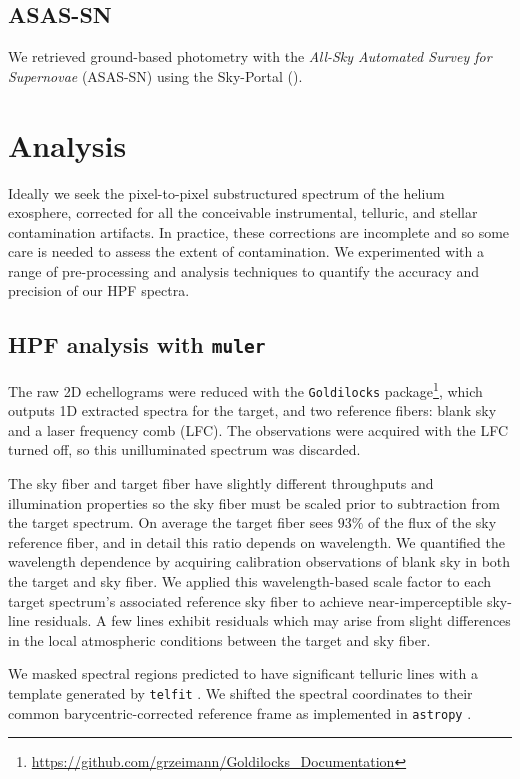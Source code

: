 \documentclass[twocolumn]{aastex631}
\begin{document}
\subsection{ASAS-SN}
We retrieved ground-based photometry with the \emph{All-Sky Automated Survey for Supernovae} (ASAS-SN) using the Sky-Portal ().



\section{Analysis}


Ideally we seek the pixel-to-pixel substructured spectrum of the helium exosphere, corrected for all the conceivable instrumental, telluric, and stellar contamination artifacts.  In practice, these corrections are incomplete and so some care is needed to assess the extent of contamination.  We experimented with a range of pre-processing and analysis techniques to quantify the accuracy and precision of our HPF spectra.

\subsection{HPF analysis with \texttt{muler} }

The raw 2D echellograms were reduced with the \texttt{Goldilocks} package\footnote{\url{https://github.com/grzeimann/Goldilocks_Documentation}}, which outputs 1D extracted spectra for the target, and two reference fibers: blank sky and a laser frequency comb (LFC).  The observations were acquired with the LFC turned off, so this unilluminated spectrum was discarded.

The sky fiber and target fiber have slightly different throughputs and illumination properties so the sky fiber must be scaled prior to subtraction from the target spectrum.  On average the target fiber sees $93\%$ of the flux of the sky reference fiber, and in detail this ratio depends on wavelength.  We quantified the wavelength dependence by acquiring calibration observations of blank sky in both the target and sky fiber.  We applied this wavelength-based scale factor to each target spectrum's associated reference sky fiber to achieve near-imperceptible sky-line residuals.  A few lines exhibit residuals which may arise from slight differences in the local atmospheric conditions between the target and sky fiber.

We masked spectral regions predicted to have significant telluric lines with a template generated by \texttt{telfit} \citep{2014AJ....148...53G}.  We shifted the spectral coordinates to their common barycentric-corrected reference frame \citep{2014PASP..126..838W} as implemented in \texttt{astropy} \citep{2013A&A...558A..33A,2018AJ....156..123A}.
\end{document}
